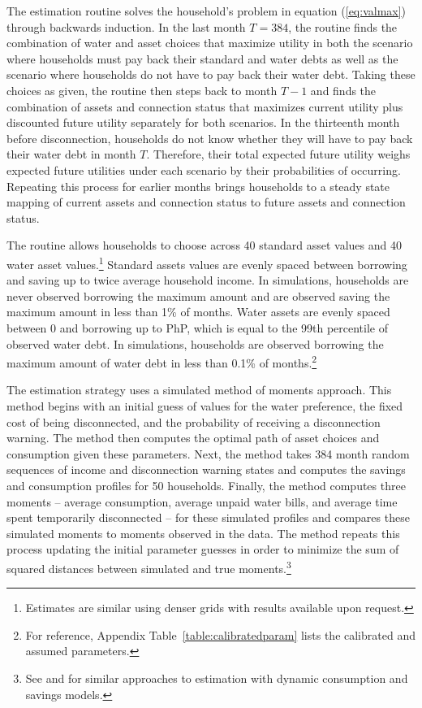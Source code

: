 \documentclass[12pt,table]{article}
\begin{document}
The estimation routine solves the household's problem in equation (\ref{eq:valmax}) through backwards induction.  In the last month $T=384$, the routine finds the combination of water and asset choices that maximize utility in both the scenario where households must pay back their standard and water debts as well as the scenario where households do not have to pay back their water debt.  Taking these choices as given, the routine then steps back to month $T-1$ and finds the combination of assets and connection status that maximizes current utility plus discounted future utility separately for both scenarios.  In the thirteenth month before disconnection, households do not know whether they will have to pay back their water debt in month $T$.  Therefore, their total expected future utility weighs expected future utilities under each scenario by their probabilities of occurring.  Repeating this process for earlier months brings households to a steady state mapping of current assets and connection status to future assets and connection status. 

The routine allows households to choose across 40 standard asset values and 40 water asset values.\footnote{Estimates are similar using denser grids with results available upon request.}  Standard assets values are evenly spaced between borrowing and saving up to twice average household income.  In simulations, households are never observed borrowing the maximum amount and are observed saving the maximum amount in less than 1\% of months.  Water assets are evenly spaced between 0 and borrowing up to PhP, which is equal to the 99th percentile of observed water debt.  In simulations, households are observed borrowing the maximum amount of water debt in less than 0.1\% of months.\footnote{For reference, Appendix Table~\ref{table:calibratedparam} lists the calibrated and assumed parameters.}

The estimation strategy uses a simulated method of moments approach.  This method begins with an initial guess of values for the water preference, the fixed cost of being disconnected, and the probability of receiving a disconnection warning.  The method then computes the optimal path of asset choices and consumption given these parameters.  Next, the method takes 384 month random sequences of income and disconnection warning states and computes the savings and consumption profiles for 50 households.  Finally, the method computes three moments -- average consumption, average unpaid water bills, and average time spent temporarily disconnected -- for these simulated profiles and compares these simulated moments to moments observed in the data.  The method repeats this process updating the initial parameter guesses in order to minimize the sum of squared distances between simulated and true moments.\footnote{See \cite{laibson2007estimating} and \cite{gourinchas2002consumption} for similar approaches to estimation with dynamic consumption and savings models.}
\end{document}
